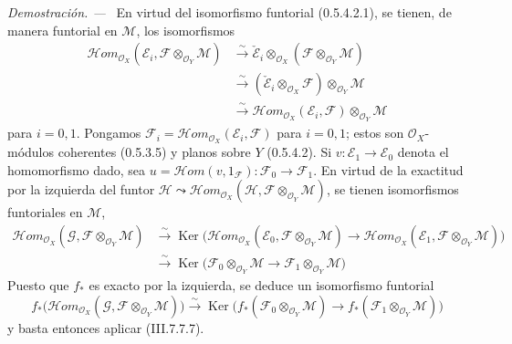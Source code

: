 \documentclass[10pt,oneside]{book}
\newcommand{\sref}[2][]{\textup{(#2)}}
\newenvironment{proof}{\par\medskip\noindent\textit{Demostración. ---\ }}{\par}
\begin{document}
\begin{proof}
En virtud del isomorfismo funtorial \sref[0]{0.5.4.2.1}, se tienen, de manera
funtorial en $\mathscr M$, los isomorfismos
\begin{align*}
  \mathscr{H}\!om_{\mathscr O_X}
    (\mathscr E_i,\mathscr F\otimes_{\mathscr O_Y}\mathscr M)
  &\xrightarrow{\sim}
  \check{\mathscr E}_i
    \otimes_{\mathscr O_X}
    (\mathscr F\otimes_{\mathscr O_Y}\mathscr M)\\
  &\xrightarrow{\sim}
  (\check{\mathscr E}_i\otimes_{\mathscr O_X}\mathscr F)
    \otimes_{\mathscr O_Y}\mathscr M\\
  &\xrightarrow{\sim}
  \mathscr{H}\!om_{\mathscr O_X}(\mathscr E_i,\mathscr F)
    \otimes_{\mathscr O_Y}\mathscr M
\end{align*}
para $i=0,1$. Pongamos
$\mathscr F_i=\mathscr{H}\!om_{\mathscr O_X}(\mathscr E_i,\mathscr F)$ para
$i=0,1$; estos son $\mathscr O_X$-módulos coherentes
\sref[0]{0.5.3.5} y planos sobre $Y$ \sref[0]{0.5.4.2}. Si
$v:\mathscr E_1\to\mathscr E_0$ denota el homomorfismo dado, sea
$u=\mathscr{H}\!om(v,1_{\mathscr F}):\mathscr F_0\to\mathscr F_1$. En virtud
de la exactitud por la izquierda del funtor
$\mathscr H\leadsto\mathscr{H}\!om_{\mathscr O_X}
(\mathscr H,\mathscr F\otimes_{\mathscr O_Y}\mathscr M)$, se tienen
isomorfismos funtoriales en $\mathscr M$,
\begin{align*}
  \mathscr{H}\!om_{\mathscr O_X}
    (\mathscr G,\mathscr F\otimes_{\mathscr O_Y}\mathscr M)
  &\xrightarrow{\sim}
  \operatorname{Ker}
  \bigl(
    \mathscr{H}\!om_{\mathscr O_X}
      (\mathscr E_0,\mathscr F\otimes_{\mathscr O_Y}\mathscr M)
    \longrightarrow
    \mathscr{H}\!om_{\mathscr O_X}
      (\mathscr E_1,\mathscr F\otimes_{\mathscr O_Y}\mathscr M)
  \bigr)\\
  &\xrightarrow{\sim}
  \operatorname{Ker}
  \bigl(
    \mathscr F_0\otimes_{\mathscr O_Y}\mathscr M
    \longrightarrow
    \mathscr F_1\otimes_{\mathscr O_Y}\mathscr M
  \bigr)
\end{align*}
Puesto que $f_*$ es exacto por la izquierda, se deduce un isomorfismo funtorial
\[
  f_*
  \bigl(
    \mathscr{H}\!om_{\mathscr O_X}
      (\mathscr G,\mathscr F\otimes_{\mathscr O_Y}\mathscr M)
  \bigr)
  \xrightarrow{\sim}
  \operatorname{Ker}
  \bigl(
    f_*(\mathscr F_0\otimes_{\mathscr O_Y}\mathscr M)
    \longrightarrow
    f_*(\mathscr F_1\otimes_{\mathscr O_Y}\mathscr M)
  \bigr)
\]
y basta entonces aplicar \sref{III.7.7.7}.
\end{proof}
\end{document}
